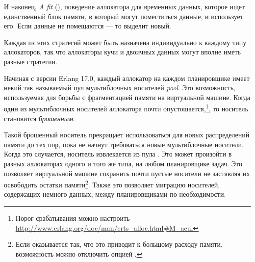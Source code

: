 И наконец, \emph{A fit} (), поведение аллокатора для временных данных, которое ищет единственный блок памяти, в который могут поместиться данные, и использует его. Если данные не помещаются --- то  выделит новый.

Каждая из этих стратегий может быть назначена индивидуально к каждому типу аллокаторов, так что аллокаторы кучи и двоичных данных могут вполне иметь разные стратегии.

Начиная с версии Erlang 17.0, каждый аллокатор  на каждом планировщике имеет некий так называемый пул мультиблочных носителей \emph{ pool}. Это возможность, используемая для борьбы с фрагментацией памяти на виртуальной машине. Когда один из мультиблочных носителей аллокатора почти опустошается,\footnote{Порог срабатывания можно настроить \href{http://www.erlang.org/doc/man/erts\_alloc.html\#M\_acul}{http://www.erlang.org/doc/man/erts\_alloc.html\#M\_acul}}, то носитель становится \emph{брошенным}.

Такой брошенный носитель прекращает использоваться для новых распределений памяти до тех пор, пока не начнут требоваться новые мультиблочные носители. Когда это случается, носитель извлекается из пула . Это может произойти в разных аллокаторах  одного и того же типа, на любом планировщике задач. Это позволяет виртуальной машине сохранить почти пустые носители не заставляя их освободить остатки памяти\footnote{Если оказывается так, что это приводит к большому расходу памяти, возможность можно отключить опцией .}. Также это позволяет миграцию носителей, содержащих немного данных, между планировщиками по необходимости.


